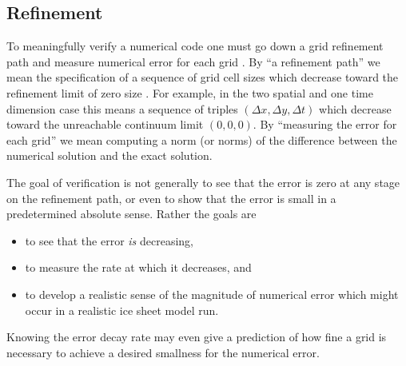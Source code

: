 \subsection{Refinement}  To meaningfully verify a numerical code one must go down a grid refinement path and measure numerical error for each grid \cite{Roache}.  By ``a refinement path'' we mean the specification of a sequence of grid cell sizes which decrease toward the refinement limit of zero size \cite{MortonMayers}.  For example, in the two spatial and one time dimension case this means a sequence of triples $(\Delta x,\Delta y,\Delta t)$ which decrease toward the unreachable continuum limit $(0,0,0)$.  By ``measuring the error for each grid'' we mean computing a norm (or norms) of the difference between the numerical solution and the exact solution.

The goal of verification is not generally to see that the error is zero at any stage on the refinement path, or even to show that the error is small in a predetermined absolute sense.  Rather the goals are
\begin{itemize}
\item to see that the error \emph{is} decreasing,
\item to measure the rate at which it decreases, and
\item to develop a realistic sense of the magnitude of numerical error which might occur in a realistic ice sheet model run.
\end{itemize}
Knowing the error decay rate may even give a prediction of how fine a grid is necessary to achieve a desired smallness for the numerical error.

